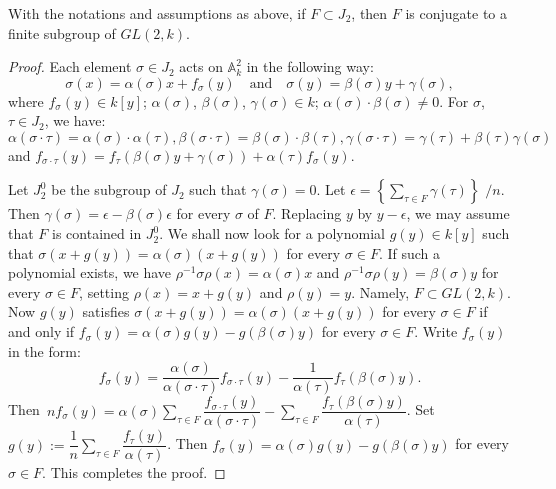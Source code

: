 \subsubsection{}\label{chap2:3.5.2}
\begin{lemma*}
  With the notations and assumptions as above, if $F\subset J_{2}$, then
  $F$ is conjugate to a finite subgroup of $GL(2,k)$.
\end{lemma*}

\begin{proof}
Each element $\sigma\in J_{2}$ acts on $\mathbb{A}^{2}_{k}$ in the
following way:
$$
\sigma(x)=\alpha(\sigma)x+f_{\sigma}(y)\quad\text{and}\quad
\sigma(y)=\beta(\sigma)y+\gamma(\sigma), 
$$
where $f_{\sigma}(y)\in k[y]$; $\alpha(\sigma)$, $\beta(\sigma)$,
$\gamma(\sigma)\in k$; $\alpha(\sigma)\cdot \beta(\sigma)\neq 0$. For
$\sigma$, $\tau\in J_{2}$, we have:
$$
\alpha(\sigma\cdot \tau)=\alpha(\sigma)\cdot
\alpha(\tau),\beta(\sigma\cdot \tau)=\beta(\sigma)\cdot
\beta(\tau),\gamma(\sigma\cdot \tau)=\gamma(\tau)+\beta(\tau)\gamma(\sigma)
$$
and
$f_{\sigma\cdot\tau}(y)=f_{\tau}(\beta(\sigma)y+\gamma(\sigma))+\alpha(\tau)f_{\sigma}(y)$.  

Let $J^{0}_{2}$ be the subgroup of $J_{2}$ such that
$\gamma(\sigma)=0$. Let
$\epsilon=\left\{{\displaystyle{\mathop{\sum}_{\tau\in
      F}}}\gamma(\tau)\right\}$ $/n$. Then
$\gamma(\sigma)=\epsilon-\beta(\sigma)\epsilon$ for every $\sigma$ of
$F$. Replacing $y$ by $y-\epsilon$, we may assume that $F$ is
contained in $J^{0}_{2}$. We shall now look for a polynomial $g(y)\in
k[y]$ such that $\sigma(x+g(y))=\alpha(\sigma)(x+g(y))$ for every
$\sigma\in F$. If such a polynomial exists, we have
$\rho^{-1}\sigma\rho(x)=\alpha(\sigma)x$ and
$\rho^{-1}\sigma\rho(y)=\beta(\sigma)y$ for every $\sigma\in F$,
setting $\rho(x)=x+g(y)$ and $\rho(y)=y$. Namely, $F\subset
GL(2,k)$. Now $g(y)$ satisfies $\sigma(x+g(y))=\alpha(\sigma)(x+g(y))$
for every $\sigma\in F$ if and only if
$f_{\sigma}(y)=\alpha(\sigma)g(y)-g(\beta(\sigma)y)$ for every
$\sigma\in F$. Write $f_{\sigma}(y)$ in the form:
$$
f_{\sigma}(y)=\frac{\alpha(\sigma)}{\alpha(\sigma\cdot\tau)}f_{\sigma\cdot
  \tau}(y)-\frac{1}{\alpha(\tau)}f_{\tau}(\beta(\sigma)y). 
$$
Then\pageoriginale\
$nf_{\sigma}(y)=\alpha(\sigma){\displaystyle{\mathop{\sum}_{\tau\in
      F}}}\dfrac{f_{\sigma\cdot
      \tau}(y)}{\alpha(\sigma\cdot\tau)}-{\displaystyle{\mathop{\sum}_{\tau
    \in F}}}\dfrac{f_{\tau}(\beta(\sigma)y)}{\alpha(\tau)}$. Set
  $g(y):=\dfrac{1}{n}{\displaystyle{\mathop{\sum}_{\tau\in
        F}}}\dfrac{f_{\tau}(y)}{\alpha(\tau)}$. Then
  $f_{\sigma}(y)=\alpha(\sigma)g(y)-g(\beta(\sigma)y)$ for every
  $\sigma\in F$. This completes the proof.
\end{proof}


